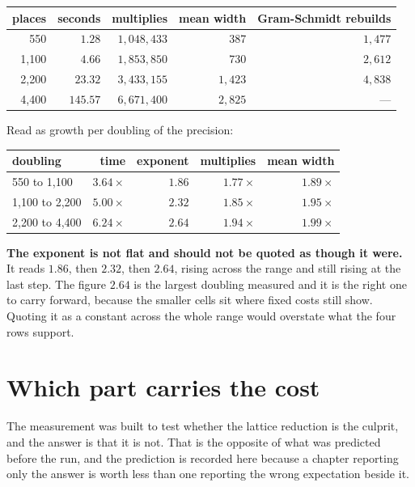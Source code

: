 \begin{center}
\begin{tabular}{@{}rrrrr@{}}
\toprule
places & seconds & multiplies & mean width & Gram-Schmidt rebuilds \\
\midrule
550 & \(1.28\) & \(1{,}048{,}433\) & 387 & \(1{,}477\) \\
1{,}100 & \(4.66\) & \(1{,}853{,}850\) & 730 & \(2{,}612\) \\
2{,}200 & \(23.32\) & \(3{,}433{,}155\) & \(1{,}423\) & \(4{,}838\) \\
4{,}400 & \(145.57\) & \(6{,}671{,}400\) & \(2{,}825\) & --- \\
\bottomrule
\end{tabular}
\end{center}

Read as growth per doubling of the precision:

\begin{center}
\begin{tabular}{@{}lrrrr@{}}
\toprule
doubling & time & exponent & multiplies & mean width \\
\midrule
550 to 1{,}100 & \(3.64\times\) & \(1.86\) & \(1.77\times\) & \(1.89\times\) \\
1{,}100 to 2{,}200 & \(5.00\times\) & \(2.32\) & \(1.85\times\) & \(1.95\times\) \\
2{,}200 to 4{,}400 & \(6.24\times\) & \(2.64\) & \(1.94\times\) & \(1.99\times\) \\
\bottomrule
\end{tabular}
\end{center}

\textbf{The exponent is not flat and should not be quoted as though it were.} It reads \(1.86\), then \(2.32\), then \(2.64\), rising across the range and still rising at the last step. The figure \(2.64\) is the largest doubling measured and it is the right one to carry forward, because the smaller cells sit where fixed costs still show. Quoting it as a constant across the whole range would overstate what the four rows support.

\section{Which part carries the cost}

The measurement was built to test whether the lattice reduction is the culprit, and the answer is that it is not. That is the opposite of what was predicted before the run, and the prediction is recorded here because a chapter reporting only the answer is worth less than one reporting the wrong expectation beside it.

